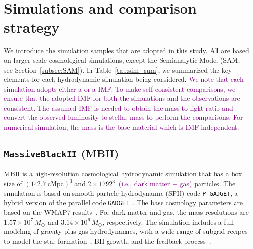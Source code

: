 \documentclass[twocolumn]{aastex631}
\newcommand{\todo}[1]{\textcolor{red}{[{\bf TODO}: #1]}}
\newcommand{\red}[1]{\textcolor{purple}{#1}}
\newcommand{\aklant}[1]{\textcolor{blue}{#1}}
\begin{document}
\section{Simulations and comparison strategy}
\label{sec:simulations}
We introduce the simulation samples that are adopted in this study. All are based on larger-scale cosmological simulations, except the Semianalytic Model (SAM; see Section~\ref{subsec:SAM}). In Table~\ref{tab:sim_sum}, we summarized the key elements for each hydrodynamic simulation being considered. \red{We note that each simulation adopts either a  \cite{2003PASP..115..763C} or a \cite{1955ApJ...121..161S} IMF. To make self-consistent comparisons, we ensure that the adopted IMF for both the simulations and the observations are consistent. The assumed IMF is needed to obtain the mass-to-light ratio and convert the observed luminosity to stellar mass to perform the comparisons. For numerical simulation, the mass is the base material which is IMF independent.}


\subsection{{\tt MassiveBlackII} (MBII)}\label{subsec:MBII}
MBII is a high-resolution cosmological hydrodynamic simulation that has a box size of $(142.7~\mathrm{cMpc})^3$
and $2\times1792^3$~\red{(i.e., dark matter + gas)} particles. 
The simulation is based on smooth particle hydrodynamic (SPH) code \texttt{P-GADGET}, a hybrid version of the parallel code {\tt GADGET}~\citep{2005MNRAS.364.1105S}. The base cosmology parameters are based on the WMAP7 results~\citep{2011ApJS..192...18K}. For dark matter and gas, the mass resolutions are $1.57\times 10^7~M_{\odot}$ and $3.14\times 10^6~M_{\odot}$, respectively. The simulation includes a full modeling of gravity plus gas hydrodynamics, with a wide range of subgrid recipes to model the star formation~\citep{2003MNRAS.339..289S}, BH growth, and the feedback process~\citep{2005Natur.433..604D}. 
\end{document}
